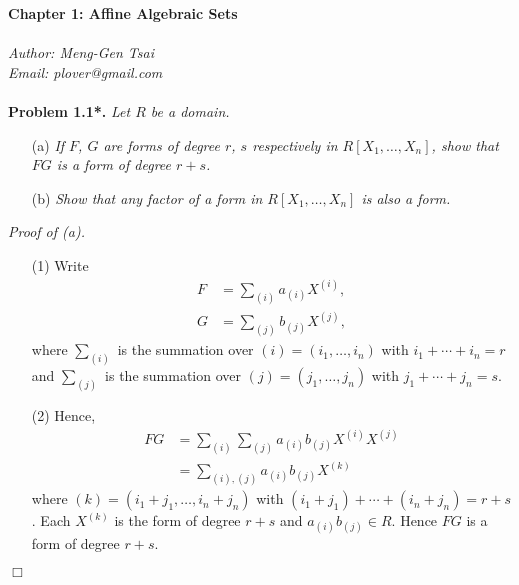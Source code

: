 \documentclass{article}
\begin{document}
\textbf{\Large Chapter 1: Affine Algebraic Sets} \\\\



\emph{Author: Meng-Gen Tsai} \\
\emph{Email: plover@gmail.com} \\\\






\textbf{Problem 1.1*.}
\emph{Let $R$ be a domain.}
\begin{enumerate}
\item[(a)]
  \emph{If $F$, $G$ are forms of degree $r$, $s$ respectively in $R[X_1,\ldots,X_n]$,
  show that $FG$ is a form of degree $r+s$.}

\item[(b)]
  \emph{Show that any factor of a form in $R[X_1,\ldots,X_n]$ is also a form. } \\
\end{enumerate}

\emph{Proof of (a).}
\begin{enumerate}
\item[(1)]
  Write
  \begin{align*}
    F &= \sum_{(i)} a_{(i)} X^{(i)}, \\
    G &= \sum_{(j)} b_{(j)} X^{(j)},
  \end{align*}
  where $\sum_{(i)}$ is the summation over $(i) = (i_1,\ldots,i_n)$ with $i_1+\cdots+i_n = r$
  and $\sum_{(j)}$ is the summation over $(j) = (j_1,\ldots,j_n)$ with $j_1+\cdots+j_n = s$.

\item[(2)]
  Hence,
  \begin{align*}
    FG
    &= \sum_{(i)} \sum_{(j)} a_{(i)}b_{(j)} X^{(i)}X^{(j)} \\
    &= \sum_{(i),(j)} a_{(i)}b_{(j)} X^{(k)}
  \end{align*}
  where $(k) = (i_1+j_1,\ldots,i_n+j_n)$ with $(i_1+j_1)+\cdots+(i_n+j_n) = r+s$.
  Each $X^{(k)}$ is the form of degree $r+s$ and $a_{(i)}b_{(j)} \in R$.
  Hence $FG$ is a form of degree $r+s$.
\end{enumerate}
$\Box$\\
\end{document}
